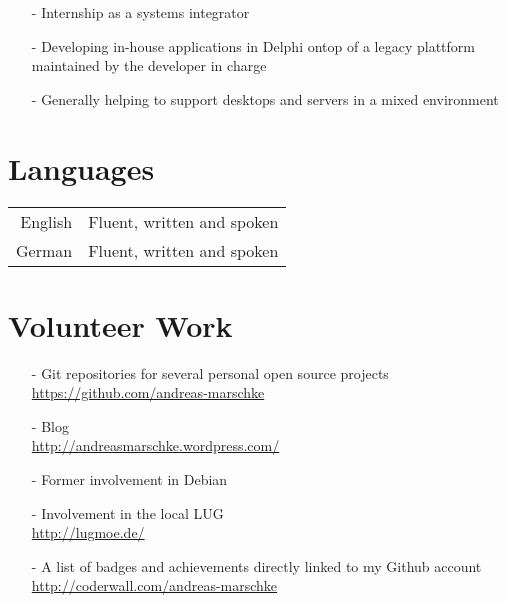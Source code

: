 \documentclass[12pt]{article}
\begin{document}
\begin{itemize}
  \item[-] Internship as a systems integrator
  \item[-] Developing in-house applications in Delphi ontop of a
    legacy plattform maintained by the developer in charge 
  \item[-] Generally helping to support desktops and servers in a
    mixed environment
\end{itemize}

\section*{Languages}

\begin{tabular}{@{} r @{ : } l @{}}
  English & Fluent, written and spoken \\
  German  & Fluent, written and spoken \\
\end{tabular}

\section*{Volunteer Work}
\begin{itemize}
  \item[-] Git repositories for several personal open source projects \\
    \url{https://github.com/andreas-marschke}
  \item[-] Blog \\
    \url{http://andreasmarschke.wordpress.com/}
  \item[-] Former involvement in Debian
  \item[-] Involvement in the local LUG \\
    \url{http://lugmoe.de/}
  \item[-] A list of badges and achievements directly linked to my Github account \\
    \url{http://coderwall.com/andreas-marschke}

	
\end{itemize}
\end{document}
